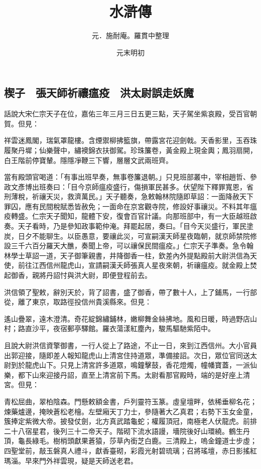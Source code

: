 \documentclass[11pt,a4paper]{article}
\title{\iyan 水滸傳}
\author{元．施耐庵。羅貫中整理}
\date{元末明初}
\begin{document}
\maketitle

\subsection{楔子　張天師祈禳瘟疫　洪太尉誤走妖魔}

話說大宋仁宗天子在位，嘉佑三年三月三日五更三點，天子駕坐紫哀殿，受百官朝賀。但見：

祥雲迷鳳閣，瑞氣罩龍樓。含煙禦柳拂籃旗，帶露宮花迎劍戟。天香影里，玉吞珠履聚丹墀；仙樂聲中，繡襖錦衣扶御駕。珍珠簾卷，黃金殿上現金輿；鳳羽扇開，白王階前停寶輦。隱隱凈鞭三下響，層層文武兩班齊。

當有殿頭官喝道：「有事出班早奏，無事卷簾退朝。」只見班部叢中，宰相趙哲、參政文彥博出班奏曰：「目今京師瘟疫盛行，傷損軍民甚多。伏望陛下釋罪寬恩，省刑薄稅，祈禳天災，救濟萬民。」天子聽奏，急敕翰林院隨即草詔：一面降赦天下罪囚，應有民間稅賦悉皆赦免；一面命在京宮觀寺院，修設好事禳災。不料其年瘟疫轉盛。仁宗天子聞知，龍體下安，復會百官計議。向那班部中，有一大臣越班啟奏。天子看時，乃是參知政事範仲淹。拜罷起居，奏曰。「目今天災盛行，軍民塗炭，日夕不能聊生。以臣愚意，要禳此災，可宣嗣漢天師星夜臨朝，就京師禁院修設三千六百分羅天大醮，奏聞上帝，可以禳保民間瘟疫。」仁宗天子準奏。急令翰林學士草詔一道，天子御筆親書，井降御香一柱，欽差內外提點殿前大尉洪信為天使，前往江西信州龍虎山，宣請嗣漢夭師張真人星夜來朝，祈禳瘟疫。就金殿上焚起御香，親將丹詔忖與洪大尉，即便登程前去。

洪信領了聖敕，辭別天於，背了詔書，盛了御香，帶了數十人，上了鋪馬，一行部從，離了東京，取路徑投信州貴溪縣來。但見：

遙山疊翠，遠木澄清。奇花綻錦繡鋪林，嫩柳舞金絲拂地。風和日暖，時過野店山村；路直沙平，夜宿郵亭驛館。羅衣蕩漾紅塵內，駿馬驅馳紫陌中。

且說大尉洪信資擎御書，一行人從上了路途，不止一日，來到江西信州。大小官員出郭迎接，隨即差人報知龍虎山上清宮住持道眾，準備接詔。次日，眾位官同送太尉到於龍虎山下。只見上清宮許多道眾，鳴鐘擊鼓，香花燈燭，幢幡寶蓋，一派仙樂，都下山來迎接丹詔，直至上清宮前下馬。太尉看那官殿時，端的是好座上清宮。但見：

青松屈曲，翠柏陰森。門懸敕額金書，戶列靈符玉篆。虛皇壇畔，依稀垂柳名花；煉藥爐邊，掩映蒼松老檜。左壁廂天丁力士，參隨著大乙真君；右勢下玉女金童，簇捧定紫微大帝。披發仗劍，北方真武踏龜蛇；權履頂冠，南極老人伏龍虎。前排二十八宿星君，後列三十二帝天子。階砌下流水語謾，墻院後好山環繞。鶴生丹頂，龜長綠毛。樹梢頭獻果蒼猿，莎草內銜芝白鹿。三清殿上，嗚金鐘道士步虛；四聖堂前，敲玉磐真人禮斗，獻香臺砌，彩霞光射碧琉璃；召將瑤壇，赤日影搖紅瑪淄。早來門外祥雲現，疑是天師送老君。
\end{document}
